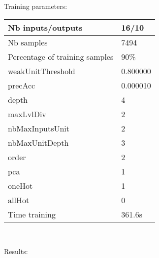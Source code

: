 Training parameters:\\
\begin{center}
\begin{tabular}{|l|l|}
\hline
Nb inputs/outputs&16/10\\
\hline
Nb samples&7494\\
\hline
Percentage of training samples&90\%\\
\hline
weakUnitThreshold&0.800000\\
\hline
precAcc&0.000010\\
\hline
depth&4\\
\hline
maxLvlDiv&2\\
\hline
nbMaxInputsUnit&2\\
\hline
nbMaxUnitDepth&3\\
\hline
order&2\\
\hline
pca&1\\
\hline
oneHot&1\\
\hline
allHot&0\\
\hline
Time training&361.6s\\
\hline
\end{tabular}\\
\end{center}\newline
Results:
